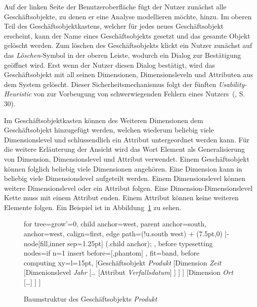 \documentclass[
  language=german, %
  type=bachelor,%
  ngerman
]{isthesis}
\begin{document}
\begin{content}
  Auf der linken Seite der Benutzeroberfläche fügt der Nutzer zunächst alle
  Geschäftsobjekte, zu denen er eine Analyse modellieren möchte, hinzu. Im
  oberen Teil des Geschäftsobjektkastens, welcher für jedes neues Geschäftsobjekt erscheint, kann
  der Name eines Geschäftsobjekts gesetzt und das gesamte Objekt gelöscht
  werden. Zum löschen des Geschäftsobjekts klickt ein Nutzer zunächst auf das
  \textit{Löschen}-Symbol in der oberen Leiste, wodurch ein Dialog zur
  Bestätigung geöffnet wird. Erst wenn der Nutzer diesen Dialog bestätigt, wird
  das Geschäftsobjekt mit all seinen Dimensionen, Dimensionsleveln und
  Attributen aus dem System gelöscht. Dieser Sicherheitsmechanismus folgt der
  fünften \textit{Usability-Heuristic} von
  \textsc{\citeauthor{nielsen1994heuristic}} zur Vorbeugung von schwerwiegenden
  Fehlern eines Nutzers~(\citeyear{nielsen1994heuristic}, S. 30).

  Im Geschäftsobjektkasten können des Weiteren Dimensionen dem Geschäftsobjekt
  hinzugefügt werden, welchen wiederum beliebig viele Dimensionslevel und
  schlussendlich ein Attribut untergeordnet werden kann. Für die weitere
  Erläuterung der Ansicht wird das Wort Element als Generalisierung von
  Dimension, Dimensionslevel und Attribut verwendet.  Einem
  Geschäftsobjekt können folglich beliebig viele Dimensionen angehören. Eine
  Dimension kann in beliebig viele Dimensionslevel aufgeteilt werden. Einem
  Dimensionslevel können weitere Dimensionslevel oder ein Attribut folgen. Eine
  Dimension-Dimensionslevel Kette muss mit einem Attribut enden. Einem Attribut
  können keine weiteren Elemente folgen. Ein Beispiel ist in
  Abbildung~\ref{fig:baumstruktur-produkt} zu sehen.

	\begin{figure}
		\footnotesize

		\begin{forest}
			for tree={grow'=0,
				child anchor=west,
				parent anchor=south,
				anchor=west,
				calign=first,
				edge path={\noexpand{}
					(!u.south west) + (7.5pt,0) |- node[fill,inner sep=1.25pt] {} (.child anchor);
				},
				before typesetting nodes={if n=1
						{insert before={[,phantom]}}
						{}
				},
				fit=band,
				before computing xy={l=15pt},
			}
		[Geschäftsobjekt \textit{Produkt}
			[Dimension \textit{Zeit}
				[Dimenionslevel \textit{Jahr}
					[\ldots{}
						[Attribut \textit{Verfallsdatum}]
					]
				]
			]
			[Dimension \textit{Ort}
				[\ldots{}]
			]
		]
		\end{forest}
    \caption{Baumstruktur des Geschäftsobjekts \textit{Produkt}}\label{fig:baumstruktur-produkt}
	\end{figure}


\end{content}
\end{document}
